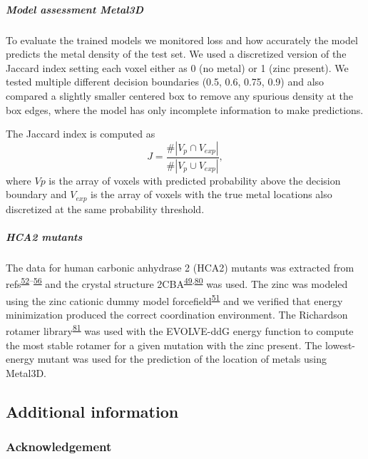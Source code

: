 \documentclass[ lineno,
  9pt]{elife}
\begin{document}
\hypertarget{model-assessment-metal3d}{%
\subparagraph{Model assessment Metal3D}\label{model-assessment-metal3d}}

To evaluate the trained models we monitored loss and how accurately the model predicts the metal density of the test set. We used a discretized version of the Jaccard index setting each voxel either as 0 (no metal) or 1 (zinc present). We tested multiple different decision boundaries (0.5, 0.6, 0.75, 0.9) and also compared a slightly smaller centered box to remove any spurious density at the box edges, where the model has only incomplete information to make predictions.

The Jaccard index is computed as
\[
J=\frac{\#\left|V_{p} \cap V_{exp}\right|}{\#\left|V_{p} \cup V_{exp}\right|},
\]
where \(Vp\) is the array of voxels with predicted probability above the decision boundary and \(V_{exp}\) is the array of voxels with the true metal locations also discretized at the same probability threshold.

\hypertarget{hca2-mutants}{%
\subparagraph{HCA2 mutants}\label{hca2-mutants}}

The data for human carbonic anhydrase 2 (HCA2) mutants was extracted from refs\textsuperscript{\protect\hyperlink{ref-D3VQQdjb}{52}--\protect\hyperlink{ref-TNbPH3Y1}{56}} and the crystal structure 2CBA\textsuperscript{\protect\hyperlink{ref-jyFnBdWm}{49},\protect\hyperlink{ref-WjHESl20}{80}} was used. The zinc was modeled using the zinc cationic dummy model forcefield\textsuperscript{\protect\hyperlink{ref-pchdLF0k}{51}} and we verified that energy minimization produced the correct coordination environment. The Richardson rotamer library\textsuperscript{\protect\hyperlink{ref-Mg40Hdad}{81}} was used with the EVOLVE-ddG energy function to compute the most stable rotamer for a given mutation with the zinc present. The lowest-energy mutant was used for the prediction of the location of metals using Metal3D.

\hypertarget{additional-information}{%
\subsection{Additional information}\label{additional-information}}

\hypertarget{acknowledgement}{%
\subsubsection{Acknowledgement}\label{acknowledgement}}
\end{document}
